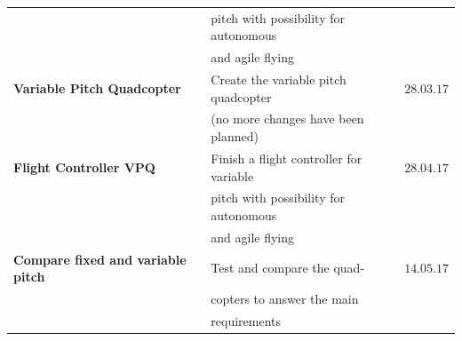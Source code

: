 \begin{table}[h]
\begin{tabular}{llc}
                                & pitch with possibility for autonomous & \\
                                & and agile flying & \\\rowcolor{gainsboro}
\textbf{Variable Pitch Quadcopter}  & Create the variable pitch quadcopter & $28.03.17$ \\\rowcolor{gainsboro}
                                    & (no more changes have been planned) & \\
\textbf{Flight Controller VPQ}  & Finish a flight controller for variable & $28.04.17$ \\
                            & pitch with possibility for autonomous & \\
                            & and agile flying & \\\rowcolor{gainsboro}
\textbf{Compare fixed and variable pitch}  & Test and compare the quad- & $14.05.17$ \\\rowcolor{gainsboro}
                                           & copters to answer the main & \\\rowcolor{gainsboro}
                                           & requirements & 
\end{tabular}                                                               
\end{table}

